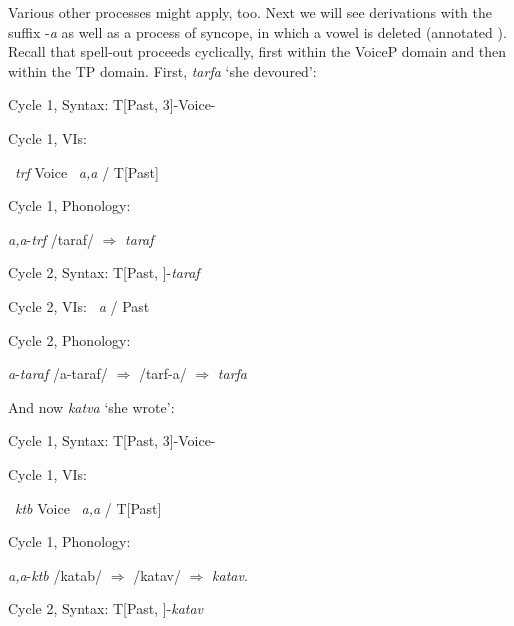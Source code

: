 \begin{exe}
\begin{xlist}
\begin{exe}
\begin{xlist}
\begin{exe}
\begin{xlist}
\begin{exe}
\begin{exe}
\begin{xlist}
\begin{exe}
\begin{xlist}
\begin{exe}
\begin{xlist}
\begin{exe}
\begin{xlist}
\begin{exe}
\begin{xlist}
\begin{exe}
\begin{xlist}
\begin{exe}
\begin{xlist}
\begin{exe}
\begin{xlist}
\begin{exe}
\begin{xlist}
\begin{exe}
\begin{xlist}
\begin{exe}
\begin{xlist}
\begin{exe}
\begin{xlist}
\begin{exe}
\begin{xlist}
\begin{exe}
\begin{exe}
\begin{xlist}
\begin{exe}
\begin{xlist}
\begin{exe}
\begin{xlist}
\begin{exe}
\begin{xlist}
{\begin{exe}
\begin{xlist}
\begin{exe}
\begin{xlist}
\begin{exe}
\begin{xlist}
Various other processes might apply, too. Next we will see derivations with the  suffix -\emph{a} as well as a process of syncope, in which a vowel is deleted (annotated ). Recall that spell-out proceeds cyclically, first within the VoiceP domain and then within the TP domain. First, \emph{tarfa} `she devoured':
 \begin{exe}
\ex   Cycle 1, Syntax: 
	 T[Past, 3]-Voice-

 \ex  Cycle 1, VIs: 
 \begin{xlist} 
 	\ex   {} \lra~\emph{trf} 
 	\ex   Voice \lra~\emph{a,a} / T[Past] \trace 
 \z

 \ex  Cycle 1, Phonology: 
 \begin{xlist} 
 	\ex   \emph{a,a}-\emph{trf} 
 	\ex   /taraf/ $\Rightarrow$ \emph{taraf} 
 \z

\ex  Cycle 2, Syntax: 
	T[Past, ]-\emph{taraf}

\ex   Cycle 2, VIs: 
	 \lra~\emph{a} / Past \trace

 \ex  Cycle 2, Phonology: 
 \begin{xlist} 
 	\ex   \emph{a}-\emph{taraf} 
 	\ex   /a-taraf/ $\Rightarrow$ /tarf-a/ $\Rightarrow$ \emph{tarfa} 
 \z
\z 

And now \emph{katva} `she wrote':
 \begin{exe}
\ex  Cycle 1, Syntax: 
	T[Past, 3]-Voice-

 \ex  Cycle 1, VIs: 
 \begin{xlist} 
 	\ex  {} \lra~\emph{ktb} 
 	\ex   Voice \lra~\emph{a,a} / T[Past] \trace 
 \z

 \ex  Cycle 1, Phonology: 
 \begin{xlist} 
 	\ex   \emph{a,a}-\emph{ktb} 
 	\ex  	/katab/ $\Rightarrow$ /katav/ $\Rightarrow$ \emph{katav}. 
 \z

\ex   Cycle 2, Syntax: 
	T[Past, ]-\emph{katav}


\end{xlist}
\end{xlist}
\end{exe}
\end{xlist}
\end{xlist}
\end{xlist}
\end{exe}
\end{xlist}
\end{exe}
\end{xlist}
\end{exe}
\end{xlist}
\end{exe}}
\end{xlist}
\end{exe}
\end{xlist}
\end{exe}
\end{xlist}
\end{exe}
\end{xlist}
\end{exe}
\end{exe}
\end{xlist}
\end{exe}
\end{xlist}
\end{exe}
\end{xlist}
\end{exe}
\end{xlist}
\end{exe}
\end{xlist}
\end{exe}
\end{xlist}
\end{exe}
\end{xlist}
\end{exe}
\end{xlist}
\end{exe}
\end{xlist}
\end{exe}
\end{xlist}
\end{exe}
\end{xlist}
\end{exe}
\end{xlist}
\end{exe}
\end{xlist}
\end{exe}
\end{exe}
\end{xlist}
\end{exe}
\end{xlist}
\end{exe}
\end{xlist}
\end{exe}
